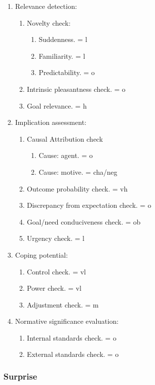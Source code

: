 \begin{enumerate}
\item  Relevance detection:
\begin{enumerate}
\item  Novelty check:
\begin{enumerate}
\item  Suddenness. = l
\item  Familiarity. = l
\item  Predictability. = o
\end{enumerate}
\item  Intrinsic pleasantness check. = o
\item  Goal relevance. = h
\end{enumerate}
\item  Implication assessment:
\begin{enumerate}
\item  Causal Attribution check
\begin{enumerate}
\item  Cause: agent. = o
\item  Cause: motive. = cha/neg
\end{enumerate}
\item  Outcome probability check. = vh
\item  Discrepancy from expectation check. = o
\item  Goal/need conduciveness check. = ob
\item  Urgency check. = l
\end{enumerate}
\item  Coping potential:
\begin{enumerate}
\item  Control check. = vl
\item  Power check. = vl
\item  Adjustment check. = m
\end{enumerate}
\item  Normative significance evaluation:
\begin{enumerate}
\item  Internal standards check. = o
\item  External standards check. = o
\end{enumerate}
\end{enumerate}

\subsubsection{Surprise}


